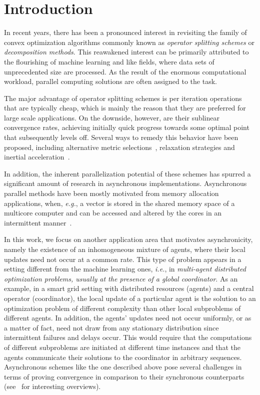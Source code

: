 \documentclass[envcountsect]{svjour3}
\newcommand{\eg}{{\it e.g.}}
\newcommand{\ie}{{\it i.e.}}
\begin{document}

\section{Introduction}\label{intro} %

In recent years, there has been a pronounced interest in revisiting the family of convex optimization algorithms commonly known as \emph{operator splitting schemes} or \emph{decomposition methods}.
This reawakened interest can be primarily attributed to the flourishing of machine learning and like fields, where data sets of unprecedented size are processed. As the result of the enormous computational
workload, parallel computing solutions are often assigned to the task.

The major advantage of operator splitting schemes is per iteration operations that are typically cheap, which is mainly the reason that they are preferred for large scale applications. On the downside, however, are their
sublinear convergence rates, achieving initially quick progress towards some optimal point that subsequently levels off. Several ways to remedy this behavior have been proposed, including alternative metric selections~\cite{combettes2014variable}, relaxation strategies and inertial acceleration~\cite{AlvarezAttouch2001}.

In addition, the inherent parallelization potential of these schemes has spurred a significant amount of research in asynchronous implementations. Asynchronous parallel methods have been mostly motivated from memory allocation applications, when, \eg, a vector is stored in the shared memory space of a multicore computer and can be accessed and altered by the cores in an intermittent manner~\cite{liu2015asynchronous,peng2015arock}.

In this work, we focus on another application area that motivates asynchronicity, namely the existence of an inhomogeneous mixture of agents, where their local updates need not occur at a common rate. This type of problem appears in a setting different from the machine learning ones, \ie, in \emph{multi-agent distributed optimization problems, usually at the presence of a global coordinator}. As an example, in a smart grid setting with distributed resources (agents) and a central operator (coordinator), the local update of a particular agent is the solution to an optimization problem of different complexity than other local subproblems of different agents. In addition, the agents' updates need not occur uniformly, or as a matter of fact, need not draw from any stationary distribution since intermittent failures and delays occur. This would require that the computations of different subproblems are initiated at different time instances and that the agents communicate their solutions to the coordinator in arbitrary sequences. Asynchronous schemes like the one described above pose several challenges in terms of proving convergence in comparison to their synchronous counterparts (see~\cite{bertsekas1989parallel,wright2015coordinate} for interesting overviews).
\end{document}
